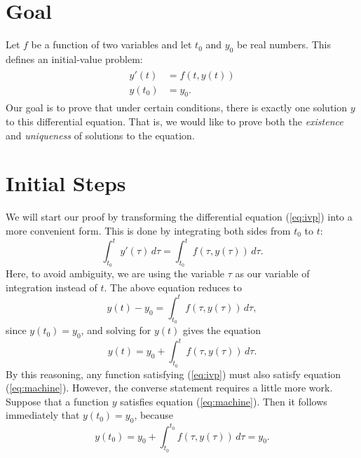 \documentclass{myart}
\newcommand{\eq}[1]{(\ref{eq:#1})}
\begin{document}

\section{Goal}

Let $f$ be a function of two variables and let $t_0$ and $y_0$ be real numbers. This defines an initial-value problem:
\begin{align} \label{eq:ivp}
\begin{split}
y'(t) &= f(t, y(t)) \\
y(t_0) &= y_0.
\end{split}
\end{align}
Our goal is to prove that under certain conditions, there is exactly one solution $y$ to this differential equation. That is, we would like to prove both the \emph{existence} and \emph{uniqueness} of solutions to the equation.

\section{Initial Steps}

We will start our proof by transforming the differential equation \eq{ivp} into a more convenient form. This is done by integrating both sides from $t_0$ to $t$:
\begin{equation*}
\int_{t_0}^t y'(\tau) \,d\tau = \int_{t_0}^t f(\tau, y(\tau)) \,d\tau.
\end{equation*}
Here, to avoid ambiguity, we are using the variable $\tau$ as our variable of integration instead of $t$. The above equation reduces to
\begin{equation*}
y(t) - y_0 = \int_{t_0}^t f(\tau, y(\tau)) \,d\tau,
\end{equation*}
since $y(t_0) = y_0$, and solving for $y(t)$ gives the equation
\begin{equation} \label{eq:machine}
y(t) = y_0 + \int_{t_0}^t f(\tau, y(\tau)) \,d\tau.
\end{equation}
By this reasoning, any function satisfying \eq{ivp} must also satisfy equation \eq{machine}. However, the converse statement requires a little more work. Suppose that a function $y$ satisfies equation \eq{machine}. Then it follows immediately that $y(t_0) = y_0$, because
\begin{equation*}
y(t_0) = y_0 + \int_{t_0}^{t_0} f(\tau, y(\tau)) \,d\tau = y_0.
\end{equation*}
\end{document}
